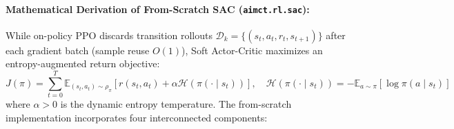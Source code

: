 \documentclass[11pt,a4paper]{article}
\begin{document}
\paragraph{Mathematical Derivation of From-Scratch SAC (\texttt{aimct.rl.sac}):}
While on-policy PPO discards transition rollouts $\mathcal{D}_k = \{(s_t, a_t, r_t, s_{t+1})\}$ after each gradient batch (sample reuse $O(1)$), Soft Actor-Critic maximizes an entropy-augmented return objective:
\begin{equation}
J(\pi) = \sum_{t=0}^T \mathbb{E}_{(s_t, a_t)\sim\rho_\pi} \left[ r(s_t, a_t) + \alpha \mathcal{H}(\pi(\cdot \mid s_t)) \right], \quad \mathcal{H}(\pi(\cdot \mid s_t)) = -\mathbb{E}_{a\sim\pi} [\log \pi(a \mid s_t)]
\end{equation}
where $\alpha > 0$ is the dynamic entropy temperature. The from-scratch implementation incorporates four interconnected components:
\end{document}
